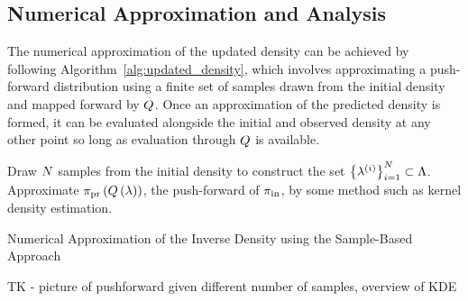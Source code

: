 \subsection{Numerical Approximation and Analysis}\label{sec:sample-algorithm}

The numerical approximation of the updated density can be achieved by following Algorithm~\ref{alg:updated_density}, which involves approximating a push-forward distribution using a finite set of samples drawn from the initial density and mapped forward by $Q$.
Once an approximation of the predicted density is formed, it can be evaluated alongside the initial and observed density at any other point so long as evaluation through $Q$ is available.



\begin{algorithm}[hbtp]
\DontPrintSemicolon
Draw $N$ samples from the initial density to construct the set $\left\{\lambda^{(i)}\right\}_{i=1}^{N} \subset {\Lambda}$.
	Approximate $\operatorname*{\pi_{pr}}\left ( Q\left ( \lambda \right ) \right )$, the push-forward of $\operatorname*{\pi_{in}}$, by some method such as kernel density estimation.

 \caption{Numerical Approximation of the Inverse Density using the Sample-Based Approach}
 \label{alg:updated_density}
\end{algorithm}

TK -
picture of pushforward given different number of samples, overview of KDE
